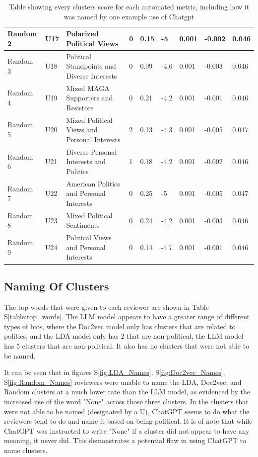 \documentclass{article}
\begin{document}
\begin{table}[!ht]
\begin{tabular}{|p{2cm}|p{2cm}|p{6cm}|p{1.2cm}|p{1cm}|p{1cm}|p{1.1cm}|p{1.3cm}|p{1cm}|}
        Random 2 & U17 & Polarized Political Views & 0 & 0.15 & -5 & 0.001 & -0.002 & 0.046 \\ \hline
        Random 3 & U18 & Political Standpoints and Diverse Interests & 0 & 0.09 & -4.6 & 0.001 & -0.003 & 0.046 \\ \hline
        Random 4 & U19 & Mixed MAGA Supporters and Resistors & 0 & 0.21 & -4.2 & 0.001 & -0.001 & 0.046 \\ \hline
        Random 5 & U20 & Mixed Political Views and Personal Interests & 2 & 0.13 & -4.3 & 0.001 & -0.005 & 0.047 \\ \hline
        Random 6 & U21 & Diverse Personal Interests and Politics & 1 & 0.18 & -4.2 & 0.001 & -0.002 & 0.046 \\ \hline
        Random 7 & U22 & American Politics and Personal Interests & 0 & 0.25 & -5 & 0.001 & -0.005 & 0.047 \\ \hline
        Random 8 & U23 & Mixed Political Sentiments & 0 & 0.24 & -4.2 & 0.001 & -0.003 & 0.046 \\ \hline
        Random 9 & U24 & Political Views and Personal Interests & 0 & 0.14 & -4.7 & 0.001 & -0.001 & 0.046 \\ \hline
    \end{tabular}
    \caption{Table showing every clusters score for each automated metric, including how it was named by one example use of Chatgpt}
    \label{table:Automated_table}
\end{table}
\restoregeometry



\subsection{Naming Of Clusters}

The top words that were given to each reviewer are shown in Table S\ref{table:top_words}. The LLM model appears to have a greater range of different types of bios, where the Doc2vec model only has clusters that are related to politics, and the LDA model only has 2 that are non-political, the LLM model has 5 clusters that are non-political. It also has no clusters that were not able to be named.


It can be seen that in figures S\ref{fig:LDA_Names}, S\ref{fig:Doc2vec_Names},  S\ref{fig:Random_Names}
reviewers were unable to name the LDA, Doc2vec, and Random clusters at a much lower rate than the LLM model, as evidenced by the increased use of the word "None" across those three clusters. In the clusters that were not able to be named (designated by a U), ChatGPT seems to do what the reviewers tend to do and name it based on being political. It is of note that while ChatGPT was instructed to write "None" if a cluster did not appear to have any meaning, it never did. This demonstrates a potential flaw in using ChatGPT to name clusters.
\end{document}

